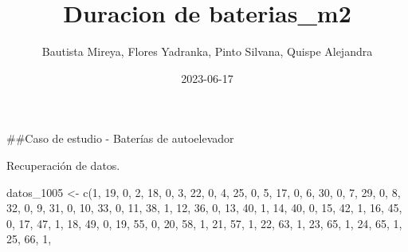 \documentclass[
]{article}
\title{Duracion de baterias\_m2}
\author{Bautista Mireya, Flores Yadranka, Pinto Silvana, Quispe
Alejandra}
\date{2023-06-17}
\newenvironment{Shaded}{\begin{snugshade}}{\end{snugshade}}
\newcommand{\DecValTok}[1]{\textcolor[rgb]{0.00,0.00,0.81}{#1}}
\newcommand{\FunctionTok}[1]{\textcolor[rgb]{0.00,0.00,0.00}{#1}}
\newcommand{\NormalTok}[1]{#1}
\newcommand{\OtherTok}[1]{\textcolor[rgb]{0.56,0.35,0.01}{#1}}
\begin{document}
\maketitle

\#\#Caso de estudio - Baterías de autoelevador

Recuperación de datos.

\begin{Shaded}
\begin{Highlighting}[]
\NormalTok{datos\_1005 }\OtherTok{\textless{}{-}} \FunctionTok{c}\NormalTok{(}\DecValTok{1}\NormalTok{,  }\DecValTok{19}\NormalTok{, }\DecValTok{0}\NormalTok{,}
\DecValTok{2}\NormalTok{,  }\DecValTok{18}\NormalTok{, }\DecValTok{0}\NormalTok{,}
\DecValTok{3}\NormalTok{,  }\DecValTok{22}\NormalTok{, }\DecValTok{0}\NormalTok{,}
\DecValTok{4}\NormalTok{,  }\DecValTok{25}\NormalTok{, }\DecValTok{0}\NormalTok{,}
\DecValTok{5}\NormalTok{,  }\DecValTok{17}\NormalTok{, }\DecValTok{0}\NormalTok{,}
\DecValTok{6}\NormalTok{,  }\DecValTok{30}\NormalTok{, }\DecValTok{0}\NormalTok{,}
\DecValTok{7}\NormalTok{,  }\DecValTok{29}\NormalTok{, }\DecValTok{0}\NormalTok{,}
\DecValTok{8}\NormalTok{,  }\DecValTok{32}\NormalTok{, }\DecValTok{0}\NormalTok{,}
\DecValTok{9}\NormalTok{,  }\DecValTok{31}\NormalTok{, }\DecValTok{0}\NormalTok{,}
\DecValTok{10}\NormalTok{, }\DecValTok{33}\NormalTok{, }\DecValTok{0}\NormalTok{,}
\DecValTok{11}\NormalTok{, }\DecValTok{38}\NormalTok{, }\DecValTok{1}\NormalTok{,}
\DecValTok{12}\NormalTok{, }\DecValTok{36}\NormalTok{, }\DecValTok{0}\NormalTok{,}
\DecValTok{13}\NormalTok{, }\DecValTok{40}\NormalTok{, }\DecValTok{1}\NormalTok{,}
\DecValTok{14}\NormalTok{, }\DecValTok{40}\NormalTok{, }\DecValTok{0}\NormalTok{,}
\DecValTok{15}\NormalTok{, }\DecValTok{42}\NormalTok{, }\DecValTok{1}\NormalTok{,}
\DecValTok{16}\NormalTok{, }\DecValTok{45}\NormalTok{, }\DecValTok{0}\NormalTok{,}
\DecValTok{17}\NormalTok{, }\DecValTok{47}\NormalTok{, }\DecValTok{1}\NormalTok{,}
\DecValTok{18}\NormalTok{, }\DecValTok{49}\NormalTok{, }\DecValTok{0}\NormalTok{,}
\DecValTok{19}\NormalTok{, }\DecValTok{55}\NormalTok{, }\DecValTok{0}\NormalTok{,}
\DecValTok{20}\NormalTok{, }\DecValTok{58}\NormalTok{, }\DecValTok{1}\NormalTok{,}
\DecValTok{21}\NormalTok{, }\DecValTok{57}\NormalTok{, }\DecValTok{1}\NormalTok{,}
\DecValTok{22}\NormalTok{, }\DecValTok{63}\NormalTok{, }\DecValTok{1}\NormalTok{,}
\DecValTok{23}\NormalTok{, }\DecValTok{65}\NormalTok{, }\DecValTok{1}\NormalTok{,}
\DecValTok{24}\NormalTok{, }\DecValTok{65}\NormalTok{, }\DecValTok{1}\NormalTok{,}
\DecValTok{25}\NormalTok{, }\DecValTok{66}\NormalTok{, }\DecValTok{1}\NormalTok{,}

\end{Highlighting}
\end{Shaded}
\end{document}
